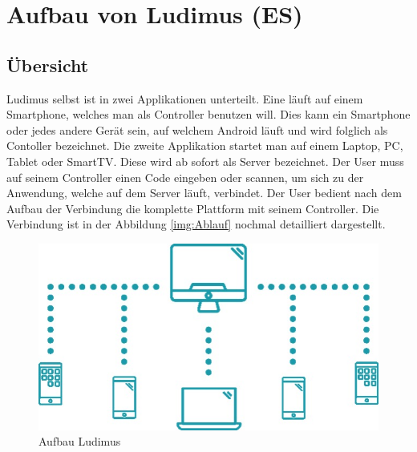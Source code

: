 \section{Aufbau von Ludimus (ES)}
\subsection{Übersicht}
Ludimus selbst ist in zwei Applikationen unterteilt. Eine läuft auf einem Smartphone, welches man als Controller benutzen will.
Dies kann ein Smartphone oder jedes andere Gerät sein, auf welchem Android läuft und wird folglich als Contoller bezeichnet. Die zweite Applikation startet man auf einem Laptop, PC, Tablet oder SmartTV. Diese wird ab sofort als Server bezeichnet. Der User muss auf seinem Controller einen Code eingeben oder scannen, um sich zu der Anwendung, welche auf dem Server läuft, verbindet. Der User bedient nach dem Aufbau der Verbindung die komplette Plattform mit seinem Controller. Die Verbindung ist in der Abbildung \ref{img:Ablauf} nochmal detailliert dargestellt.
\begin{figure}
    \includegraphics[scale=0.6]{images/ludi.jpg}
    \caption{Aufbau Ludimus}
    \label{img:Aufbau}
\end{figure}
\pagebreak
